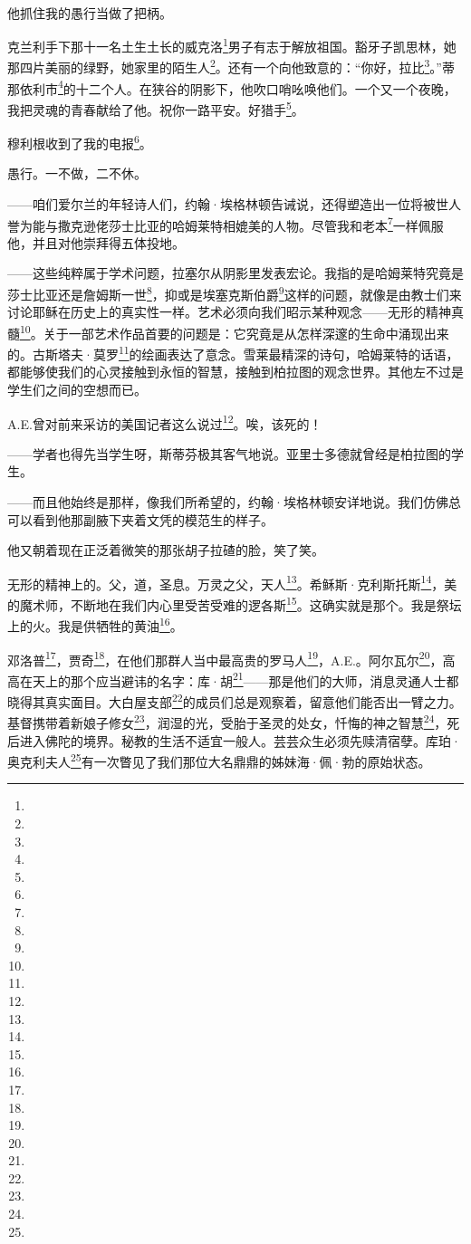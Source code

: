 \par  
\par 他抓住我的愚行当做了把柄。
\par 克兰利手下那十一名土生土长的威克洛\footnote{}男子有志于解放祖国。豁牙子凯思林，她那四片美丽的绿野，她家里的陌生人\footnote{}。还有一个向他致意的：“你好，拉比\footnote{}。”蒂那依利市\footnote{}的十二个人。在狭谷的阴影下，他吹口哨吆唤他们。一个又一个夜晚，我把灵魂的青春献给了他。祝你一路平安。好猎手\footnote{}。
\par 穆利根收到了我的电报\footnote{}。
\par 愚行。一不做，二不休。
\par ——咱们爱尔兰的年轻诗人们，约翰·埃格林顿告诫说，还得塑造出一位将被世人誉为能与撒克逊佬莎士比亚的哈姆莱特相媲美的人物。尽管我和老本\footnote{}一样佩服他，并且对他崇拜得五体投地。
\par ——这些纯粹属于学术问题，拉塞尔从阴影里发表宏论。我指的是哈姆莱特究竟是莎士比亚还是詹姆斯一世\footnote{}，抑或是埃塞克斯伯爵\footnote{}这样的问题，就像是由教士们来讨论耶稣在历史上的真实性一样。艺术必须向我们昭示某种观念——无形的精神真髓\footnote{}。关于一部艺术作品首要的问题是：它究竟是从怎样深邃的生命中涌现出来的。古斯塔夫·莫罗\footnote{}的绘画表达了意念。雪莱最精深的诗句，哈姆莱特的话语，都能够使我们的心灵接触到永恒的智慧，接触到柏拉图的观念世界。其他左不过是学生们之间的空想而已。
\par A.E.曾对前来采访的美国记者这么说过\footnote{}。唉，该死的！
\par ——学者也得先当学生呀，斯蒂芬极其客气地说。亚里士多德就曾经是柏拉图的学生。
\par ——而且他始终是那样，像我们所希望的，约翰·埃格林顿安详地说。我们仿佛总可以看到他那副腋下夹着文凭的模范生的样子。
\par 他又朝着现在正泛着微笑的那张胡子拉碴的脸，笑了笑。
\par 无形的精神上的。父，道，圣息。万灵之父，天人\footnote{}。希稣斯·克利斯托斯\footnote{}，美的魔术师，不断地在我们内心里受苦受难的逻各斯\footnote{}。这确实就是那个。我是祭坛上的火。我是供牺牲的黄油\footnote{}。
\par 邓洛普\footnote{}，贾奇\footnote{}，在他们那群人当中最高贵的罗马人\footnote{}，A.E.。阿尔瓦尔\footnote{}，高高在天上的那个应当避讳的名字：库·胡\footnote{}——那是他们的大师，消息灵通人士都晓得其真实面目。大白屋支部\footnote{}的成员们总是观察着，留意他们能否出一臂之力。基督携带着新娘子修女\footnote{}，润湿的光，受胎于圣灵的处女，忏悔的神之智慧\footnote{}，死后进入佛陀的境界。秘教的生活不适宜一般人。芸芸众生必须先赎清宿孽。库珀·奥克利夫人\footnote{}有一次瞥见了我们那位大名鼎鼎的姊妹海·佩·勃的原始状态。
